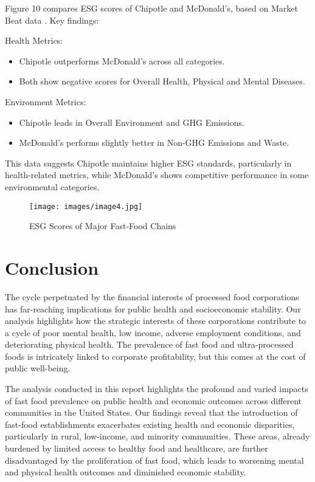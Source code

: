 \documentclass[letterpaper, 11pt]{report}
\begin{document}
Figure 10 compares ESG scores of Chipotle and McDonald's, based on Market Beat data \cite{marketbeat2024} \cite{marketbeat2024_cmg}. Key findings:

Health Metrics:
\begin{itemize}
    \item Chipotle outperforms McDonald's across all categories.
    \item Both show negative scores for Overall Health, Physical and Mental Diseases.
\end{itemize}

Environment Metrics:
\begin {itemize}
    \item Chipotle leads in Overall Environment and GHG Emissions.
    \item McDonald's performs slightly better in Non-GHG Emissions and Waste.
\end {itemize}

This data suggests Chipotle maintains higher ESG standards, particularly in health-related metrics, while McDonald's shows competitive performance in some environmental categories.

\begin{figure}[h!]
    \centering
    \texttt{[image: images/image4.jpg]}
    \caption{ESG Scores of Major Fast-Food Chains}
    \label{fig:employees}
\end{figure}


\newpage

\section{Conclusion}

The cycle perpetuated by the financial interests of processed food corporations has far-reaching implications for public health and socioeconomic stability. Our analysis highlights how the strategic interests of these corporations contribute to a cycle of poor mental health, low income, adverse employment conditions, and deteriorating physical health. The prevalence of fast food and ultra-processed foods is intricately linked to corporate profitability, but this comes at the cost of public well-being.

The analysis conducted in this report highlights the profound and varied impacts of fast food prevalence on public health and economic outcomes across different communities in the United States. Our findings reveal that the introduction of fast-food establishments exacerbates existing health and economic disparities, particularly in rural, low-income, and minority communities. These areas, already burdened by limited access to healthy food and healthcare, are further disadvantaged by the proliferation of fast food, which leads to worsening mental and physical health outcomes and diminished economic stability.
\end{document}
